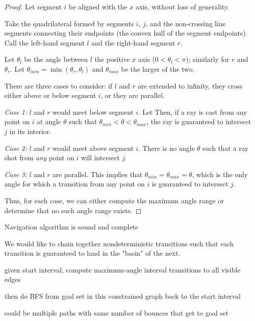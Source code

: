 \documentclass[]{styles/svproc}  %
\begin{document}
\begin{proof}
Let segment $i$ be aligned with the $x$ axis, without loss of generality.

Take the quadrilateral formed by segments $i$, $j$, and the non-crossing line
segments connecting their endpoints (the convex hull of the segment endpoints).
Call the left-hand segment $l$ and the right-hand segment $r$.

Let $\theta_{l}$ be
the angle between $l$ the positive $x$ axis ($0 < \theta_l < \pi$); similarly
for $r$ and $\theta_r$. Let $\theta_{min} = \min(\theta_r, \theta_l)$ and
$\theta_{max}$ be the larger of the two.

There are three cases to consider: if $l$ and $r$ are extended to infinity,
they cross either above or below segment $i$, or they are parallel.

\emph{Case 1:} $l$ and $r$ would meet below segment $i$. Let 
Then, if a ray is cast from any point on $i$ at angle $\theta$ such that $\theta_{min} <
\theta < \theta_{max}$, the ray is guaranteed to intersect $j$ in its interior.

\emph{Case 2:} $l$ and $r$ would meet above segment $i$. There is no angle
$\theta$ such that a ray shot from \emph{any} point on $i$ will intersect $j$.

\emph{Case 3:} $l$ and $r$ are parallel. This implies that $\theta_{min} =
\theta_{max} = \theta$, which is the only angle for which a transition from any
point on $i$ is guaranteed to intersect $j$.

Thus, for each case, we can either compute the maximum angle range or determine
that no such angle range exists.

\end{proof}



\begin{theorem}
Navigation algorithm is sound and complete
\end{theorem}


We would like to chain together nondeterministic transitions such that each
transition is guaranteed to land in the "basin" of the next.

given start interval, compute maximum-angle interval transitions to all visible
edges

then do BFS from goal set in this constrained graph back to the start interval

could be multiple paths with same number of bounces that get to goal set
\end{document}
